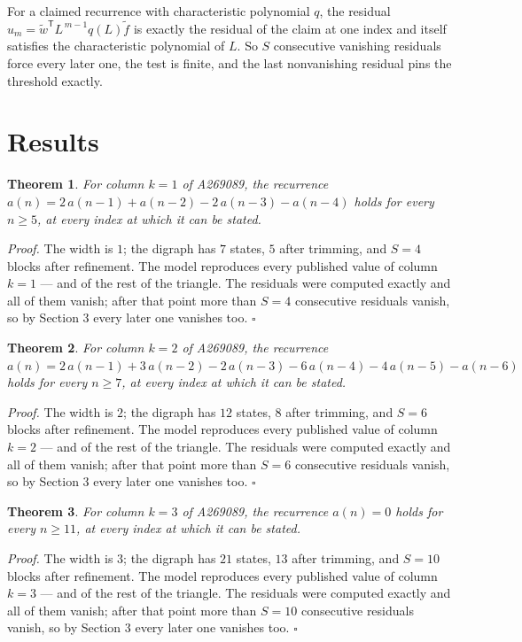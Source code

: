 \documentclass[11pt]{article}
\newtheorem{theorem}{Theorem}
\theoremstyle{definition}
\begin{document}
For a claimed recurrence with characteristic polynomial $q$, the residual $u_m = \tilde w^{\mathsf T}L^{\,m-1}q(L)\tilde f$ is exactly the residual of the claim at one index and itself satisfies the characteristic polynomial of $L$. So $S$ consecutive vanishing residuals force every later one, the test is finite, and the last nonvanishing residual pins the threshold exactly.

\section{Results}

\begin{theorem} For column $k = 1$ of A269089, the recurrence $a(n) = 2\,a(n-1) + a(n-2) - 2\,a(n-3) - a(n-4)$ holds for every $n \ge 5$, at every index at which it can be stated.\end{theorem}

{\itshape Proof.} The width is $1$; the digraph has $7$ states, $5$ after trimming, and $S = 4$ blocks after refinement. The model reproduces every published value of column $k = 1$ --- and of the rest of the triangle. The residuals were computed exactly and all of them vanish; after that point more than $S = 4$ consecutive residuals vanish, so by Section 3 every later one vanishes too. $\square$

\begin{theorem} For column $k = 2$ of A269089, the recurrence $a(n) = 2\,a(n-1) + 3\,a(n-2) - 2\,a(n-3) - 6\,a(n-4) - 4\,a(n-5) - a(n-6)$ holds for every $n \ge 7$, at every index at which it can be stated.\end{theorem}

{\itshape Proof.} The width is $2$; the digraph has $12$ states, $8$ after trimming, and $S = 6$ blocks after refinement. The model reproduces every published value of column $k = 2$ --- and of the rest of the triangle. The residuals were computed exactly and all of them vanish; after that point more than $S = 6$ consecutive residuals vanish, so by Section 3 every later one vanishes too. $\square$

\begin{theorem} For column $k = 3$ of A269089, the recurrence $a(n) = 0$ holds for every $n \ge 11$, at every index at which it can be stated.\end{theorem}

{\itshape Proof.} The width is $3$; the digraph has $21$ states, $13$ after trimming, and $S = 10$ blocks after refinement. The model reproduces every published value of column $k = 3$ --- and of the rest of the triangle. The residuals were computed exactly and all of them vanish; after that point more than $S = 10$ consecutive residuals vanish, so by Section 3 every later one vanishes too. $\square$
\end{document}
